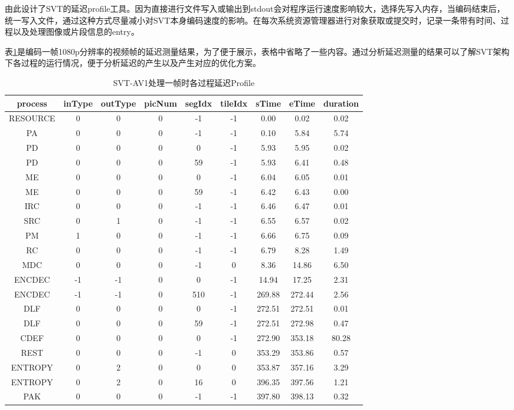   由此设计了SVT的延迟profile工具。因为直接进行文件写入或输出到stdout会对程序运行速度影响较大，选择先写入内存，当编码结束后，统一写入文件，通过这种方式尽量减小对SVT本身编码速度的影响。在每次系统资源管理器进行对象获取或提交时，记录一条带有时间、过程以及处理图像或片段信息的entry。

  表\ref{tab:svt-profile}是编码一帧1080p分辨率的视频帧的延迟测量结果，为了便于展示，表格中省略了一些内容。通过分析延迟测量的结果可以了解SVT架构下各过程的运行情况，便于分析延迟的产生以及产生对应的优化方案。

  \begin{table}[!hpt]
    \renewcommand{\arraystretch}{0.8} %
    \caption{SVT-AV1处理一帧时各过程延迟Profile}
    \label{tab:svt-profile}
    \centering
    \begin{tabular}{ccccccccc} \toprule
      process & inType & outType & picNum & segIdx & tileIdx & sTime & eTime & duration\\ \midrule
      RESOURCE & 0 & 0 & 0 & -1 & -1 & 0.00 & 0.02 & 0.02 \\
      PA & 0 & 0 & 0 & -1 & -1 & 0.10 & 5.84 & 5.74 \\
      PD & 0 & 0 & 0 & 0 & -1 & 5.93 & 5.95 & 0.02 \\
      PD & 0 & 0 & 0 & 59 & -1 & 5.93 & 6.41 & 0.48 \\
      ME & 0 & 0 & 0 & 0 & -1 & 6.04 & 6.05 & 0.01 \\
      ME & 0 & 0 & 0 & 59 & -1 & 6.42 & 6.43 & 0.00 \\
      IRC & 0 & 0 & 0 & -1 & -1 & 6.46 & 6.47 & 0.01 \\
      SRC & 0 & 1 & 0 & -1 & -1 & 6.55 & 6.57 & 0.02 \\
      PM & 1 & 0 & 0 & -1 & -1 & 6.66 & 6.75 & 0.09 \\
      RC & 0 & 0 & 0 & -1 & -1 & 6.79 & 8.28 & 1.49 \\
      MDC & 0 & 0 & 0 & -1 & 0 & 8.36 & 14.86 & 6.50 \\
      ENCDEC & -1 & -1 & 0 & 0 & -1 & 14.94 & 17.25 & 2.31 \\
      ENCDEC & -1 & -1 & 0 & 510 & -1 & 269.88 & 272.44 & 2.56 \\
      DLF & 0 & 0 & 0 & 0 & -1 & 272.51 & 272.51 & 0.01 \\
      DLF & 0 & 0 & 0 & 59 & -1 & 272.51 & 272.98 & 0.47 \\
      CDEF & 0 & 0 & 0 & 0 & -1 & 272.90 & 353.18 & 80.28 \\
      REST & 0 & 0 & 0 & -1 & 0 & 353.29 & 353.86 & 0.57 \\
      ENTROPY & 0 & 2 & 0 & 0 & 0 & 353.87 & 357.16 & 3.29 \\
      ENTROPY & 0 & 2 & 0 & 16 & 0 & 396.35 & 397.56 & 1.21 \\
      PAK & 0 & 0 & 0 & -1 & -1 & 397.80 & 398.13 & 0.32\\ \bottomrule
    \end{tabular}
  \end{table}

